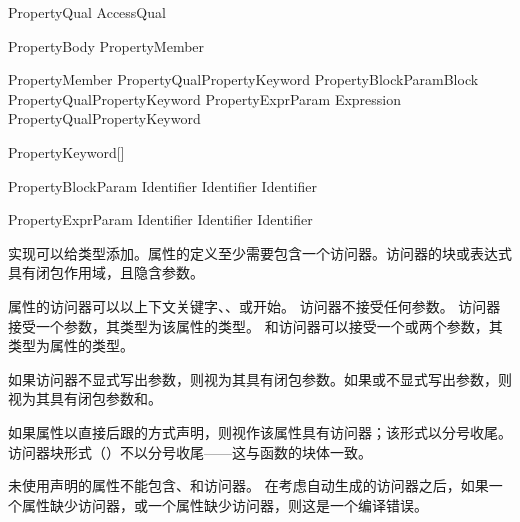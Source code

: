 \begin{bnf}{PropertyQual}
    AccessQual
\end{bnf}

\begin{bnf}{PropertyBody}
    \terminal{\{} PropertyMember\bnfp \terminal{\}}
\end{bnf}

\begin{bnf}{PropertyMember}
    PropertyQual\bnfs PropertyKeyword PropertyBlockParam\bnfq Block \br
    PropertyQual\bnfs PropertyKeyword PropertyExprParam\bnfq \terminal{=>} Expression \terminal{;} \br
    PropertyQual\bnfs PropertyKeyword \terminal{;}
\end{bnf}

\begin{bnf}{PropertyKeyword}[\oneof]
\end{bnf}

\begin{bnf}{PropertyBlockParam}
    Identifier \br
    Identifier \terminal{,} Identifier
\end{bnf}

\begin{bnf}{PropertyExprParam}
    Identifier \br
    \terminal{(} Identifier \terminal{,} Identifier \terminal{)}
\end{bnf}

\pnum
实现可以给类型添加。属性的定义至少需要包含一个访问器。访问器的块或表达式具有闭包作用域，且隐含参数。

\pnum
属性的访问器可以以上下文关键字、、或开始。
访问器不接受任何参数。
访问器接受一个参数，其类型为该属性的类型。
和访问器可以接受一个或两个参数，其类型为属性的类型。

\pnum
如果访问器不显式写出参数，则视为其具有闭包参数。如果或不显式写出参数，则视为其具有闭包参数和。

\pnum
如果属性以直接后跟的方式声明，则视作该属性具有访问器；该形式以分号收尾。访问器块形式（\tcode{\{ \ldots \}}）不以分号收尾——这与函数的块体一致。

\pnum
未使用声明的属性不能包含、和访问器。
在考虑自动生成的访问器之后，如果一个属性缺少访问器，或一个属性缺少访问器，则这是一个编译错误。

